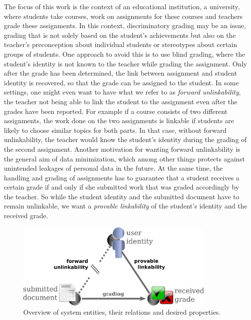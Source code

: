 The focus of this work is the context of an educational institution, \eg a
university, where students take courses, work on assignments for these
courses and teachers grade these assignments.
%
In this context, discriminatory grading may be an issue, \ie grading
that is not solely based on the student's achievements but also on the
teacher's preconception about individual students or stereotypes about 
certain groups of students.
One approach to avoid this is to use blind grading, where
the student's identity is not known to the teacher while grading the assignment.
Only after the grade has been determined, the link between assignment and student
identity is recovered, so that the grade can be assigned to the student.
%
In some settings, one might even want to have what we refer to as
\emph{forward unlinkability}, \ie the teacher not being able to link
the student to the assignment even after the grades have been reported. 
For example if a course consists of two different assignments, 
the work done on the two
assignments is linkable if students are likely to choose
similar topics for both parts. In
that case, without forward unlinkability, the teacher would know the
student's identity during the grading of the second assignment. 
Another motivation for wanting forward unlinkability is the general aim
of data minimization,
which among other things protects against unintended leakages of
personal data in the future.
%
At the same time, the handling and grading of assignments has to
guarantee that a student receives a certain grade if and only if she
submitted work that was graded accordingly by the teacher. So while the
student identity and the submitted document have to remain unlinkable,
we want a \emph{provable linkability} of the student's identity and the
received grade. 
%

\begin{figure}[htbp]
   \centering
   \includegraphics[width=0.88\textwidth]{images/document-submission-system/user-grade-document.png}
   \caption{Overview of system entities, their relations and desired properties.}
   \label{figure:document-submission-system:user-grade-document}
\end{figure}


